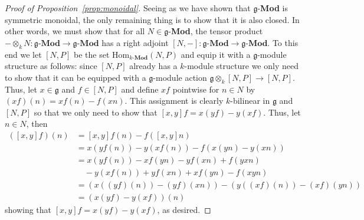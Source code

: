 \begin{proof}[Proof of Proposition~\ref{prop:monoidal}]
  Seeing as we have shown that $ \mathfrak{g} $-\textbf{Mod} is symmetric monoidal, the only remaining thing is to show that it is also closed. In other words, we must show that for all $ N \in \mathfrak{g} $-\textbf{Mod}, the tensor product $ - \otimes_k N: \mathfrak{g}\text{-}\mathbf{Mod} \to \mathfrak{g}\text{-}\mathbf{Mod} $ has a right adjoint $ [N, -]: \mathfrak{g}\text{-}\mathbf{Mod} \to \mathfrak{g}\text{-}\mathbf{Mod}  $. To this end we let $ [N, P] $ be the set $ \text{Hom}_{k\text{-}\mathbf{Mod}}(N, P) $ and equip it with a $ \mathfrak{g} $-module structure as follows: since $ [N, P] $ already has a $ k $-module structure we only need to show that it can be equipped with a $ \mathfrak{g} $-module action $ \mathfrak{g} \otimes_k [N, P] \to [N, P] $. Thus, let $ x \in \mathfrak{g} $ and $ f \in [N, P] $ and define $ xf $ pointwise for $ n \in N $ by $ (xf)(n) = xf(n) - f(xn) $. This assignment is clearly $ k $-bilinear in $ \mathfrak{g} $ and $ [N, P] $ so that we only need to show that $ [x, y]f = x(yf) - y(xf) $. Thus, let $ n \in N $, then
  \begin{align*}
    ([x,y]f)(n) &= [x,y]f(n) - f([x, y]n) \\
                &= x(yf(n)) - y(xf(n)) - f(x(yn) - y(xn)) \\
                &= x(yf(n)) - xf(yn) - yf(xn) + f(yxn) \\
                &\quad -y(xf(n)) +yf(xn) + xf(yn) - f(xyn) \\
                &= (x((yf)(n)) - (yf)(xn)) - (y((xf)(n)) - (xf)(yn)) \\
                &= (x(yf) - y(xf))(n)
  \end{align*}
  showing that $ [x, y]f = x(yf) - y(xf) $, as desired.


\end{proof}
